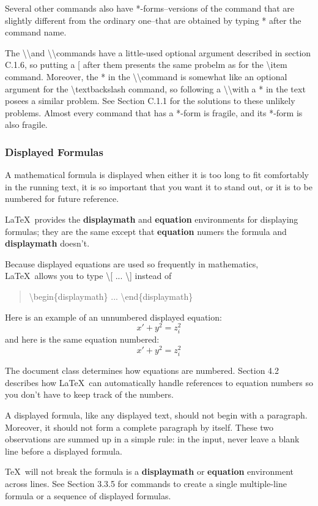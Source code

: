 \documentclass[twocolumn]{article}        %
\begin{document}
Several other commands also have *-forms--versions of the command that are slightly 
different from the ordinary one--that are obtained by typing * after the command name.

The \textbackslash \textbackslash and \textbackslash \textbackslash * commands have a little-used 
optional argument described in section C.1.6, so putting a [ after them presents the same probelm as 
for the \textbackslash item command. Moreover, the * in the \textbackslash \textbackslash * command 
is somewhat like an optional argument for the \textbackslash textbackslash command, so following a 
\textbackslash \textbackslash with a * in the text posees a similar problem. See Section C.1.1 for
the solutions to these unlikely problems. Almost every command that has a *-form is fragile, and its 
*-form is also fragile.

\subsubsection*{Displayed Formulas}

A mathematical formula is displayed when either it is too long to fit comfortably in the running text, 
it is so important that you want it to stand out, or it is to be numbered for future reference.

\LaTeX\ provides the \textbf{displaymath} and \textbf{equation} environments for displaying formulas;
they are the same except that \textbf{equation} numers the formula and \textbf{displaymath} doesn't.

Because displayed equations are used so frequently in mathematics, \LaTeX\ allows you to type 
\textbackslash [ ... \textbackslash ] instead of 

\begin{quote}
    \textbackslash begin\{displaymath\} ... \textbackslash end\{displaymath\}
\end{quote}

Here is an example of an unnumbered displayed equation:
\[ x' + y^{2} = z_{i}^{2} \] 
and here is the same equation numbered:
\begin{equation}
    x' + y^{2} = z_{i}^{2}
\end{equation}

The document class determines how equations are numbered. Section 4.2 describes how \LaTeX\ 
can automatically handle references to equation numbers so you don't have to keep track of
the numbers.

A displayed formula, like any displayed text, should not begin with a paragraph. Moreover, 
it should not form a complete paragraph by itself. These two observations are summed up in a
simple rule: in the input, never leave a blank line before a displayed formula.

\TeX\ will not break the formula is a \textbf{displaymath} or \textbf{equation} environment across lines.
See Section 3.3.5 for commands to create a single multiple-line formula or a sequence of displayed formulas.
\end{document}
